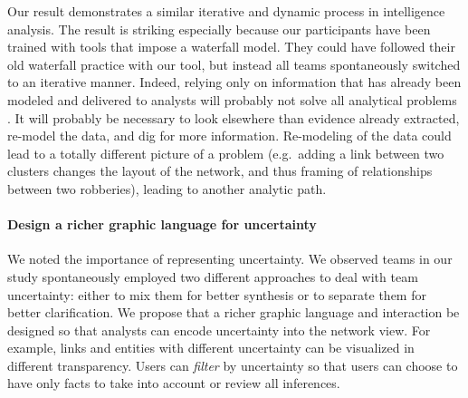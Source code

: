 Our result demonstrates a similar iterative and dynamic process in intelligence analysis. The result is striking especially because our participants have been trained with tools that impose a waterfall model. They could have followed their old waterfall practice with our tool, but instead all teams spontaneously switched to an iterative manner.
Indeed, relying only on information that has already been modeled and
delivered to analysts will probably not solve all analytical problems
\cite{Heuer1999}. It will probably be necessary to look elsewhere
than evidence already extracted, re-model the data, and dig for more
information. Re-modeling of the data could
lead to a totally different picture of a problem (e.g.~adding a link between
two clusters changes the layout of the network, and thus framing of
relationships between two robberies), leading to another analytic path. 

\paragraph{Design a richer graphic language for uncertainty}
We noted the importance of representing uncertainty. We observed teams
in our study spontaneously employed two different approaches to deal
with team uncertainty: either to mix them for better synthesis or to
separate them for better clarification. We propose that a
richer graphic language and interaction be designed so that analysts can
encode uncertainty into the network view. For example, links and
entities with different uncertainty can be visualized in different
transparency. Users can \emph{filter} by uncertainty so that users can
choose to have only facts to take into account or review all inferences.

